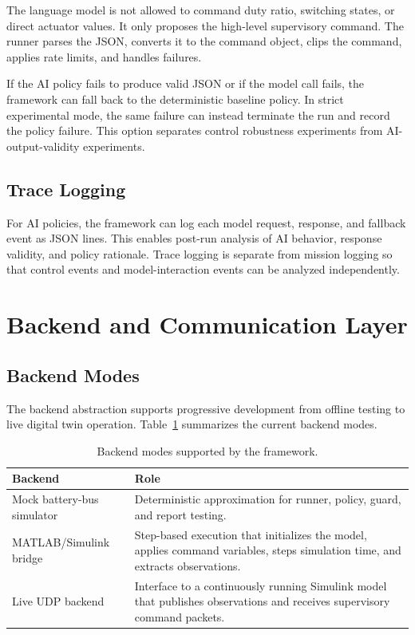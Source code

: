 \documentclass[conference]{IEEEtran}
\begin{document}
The language model is not allowed to command duty ratio, switching states, or
direct actuator values. It only proposes the high-level supervisory command.
The runner parses the JSON, converts it to the command object, clips the
command, applies rate limits, and handles failures.

If the AI policy fails to produce valid JSON or if the model call fails, the
framework can fall back to the deterministic baseline policy. In strict
experimental mode, the same failure can instead terminate the run and record
the policy failure. This option separates control robustness experiments from
AI-output-validity experiments.

\subsection{Trace Logging}

For AI policies, the framework can log each model request, response, and
fallback event as JSON lines. This enables post-run analysis of AI behavior,
response validity, and policy rationale. Trace logging is separate from
mission logging so that control events and model-interaction events can be
analyzed independently.

\section{Backend and Communication Layer}

\subsection{Backend Modes}

The backend abstraction supports progressive development from offline testing
to live digital twin operation. Table~\ref{tab:backends} summarizes the
current backend modes.

\begin{table}[t]
\caption{Backend modes supported by the framework.}
\label{tab:backends}
\centering
\small
\begin{tabular}{|p{}|p{}|}
\hline
\textbf{Backend} & \textbf{Role} \\
\hline
Mock battery-bus simulator &
Deterministic approximation for runner, policy, guard, and report testing. \\
\hline
MATLAB/\newline Simulink bridge &
Step-based execution that initializes the model, applies command variables,
steps simulation time, and extracts observations. \\
\hline
Live UDP backend &
Interface to a continuously running Simulink model that publishes observations
and receives supervisory command packets. \\
\hline
\end{tabular}
\end{table}
\end{document}
